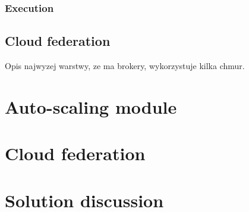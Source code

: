 \subsubsection{Execution}


\subsection{Cloud federation}
Opis najwyzej warstwy, ze ma brokery, wykorzystuje kilka chmur.


\section{Auto-scaling module}

\section{Cloud federation}

\section{Solution discussion}
